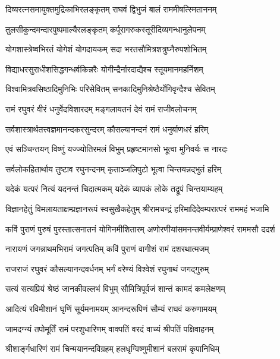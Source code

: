 \twolineshloka
{दिव्यरत्नसमायुक्तमुद्रिकाभिरलङ्कृतम्}
{राघवं द्विभुजं बालं राममीषत्स्मिताननम्}%

\twolineshloka
{तुलसीकुन्दमन्दारपुष्पमाल्यैरलङ्कृतम्}
{कर्पूरागरुकस्तूरीदिव्यगन्धानुलेपनम्}%

\twolineshloka
{योगशास्त्रेष्वभिरतं योगेशं योगदायकम्}
{सदा भरतसौमित्रशत्रुघ्नैरुपशोभितम्}%

\twolineshloka
{विद्याधरसुराधीशसिद्धगन्धर्वकिन्नरैः}
{योगीन्द्रैर्नारदाद्यैश्च स्तूयमानमहर्निशम्}%

\twolineshloka
{विश्वामित्रवसिष्ठादिमुनिभिः परिसेवितम्}
{सनकादिमुनिश्रेष्ठैर्योगिवृन्दैश्च सेवितम्}%

\twolineshloka
{रामं रघुवरं वीरं धनुर्वेदविशारदम्}
{मङ्गलायतनं देवं रामं राजीवलोचनम्}%

\twolineshloka
{सर्वशास्त्रार्थतत्त्वज्ञमानन्दकरसुन्दरम्}
{कौसल्यानन्दनं रामं धनुर्बाणधरं हरिम्}%

\twolineshloka
{एवं सञ्चिन्तयन् विष्णुं यज्ज्योतिरमलं विभुम्}
{प्रहृष्टमानसो भूत्वा मुनिवर्यः स नारदः}%

\twolineshloka
{सर्वलोकहितार्थाय तुष्टाव रघुनन्दनम्}
{कृताञ्जलिपुटो भूत्वा चिन्तयन्नद्भुतं हरिम्}%

\twolineshloka
{यदेकं यत्परं नित्यं यदनन्तं चिदात्मकम्}
{यदेकं व्यापकं लोके तद्रूपं चिन्तयाम्यहम्}%

\fourlineindentedshloka
{विज्ञानहेतुं विमलायताक्षम्}{प्रज्ञानरूपं स्वसुखैकहेतुम्}
{श्रीरामचन्द्रं हरिमादिदेवम्}{परात्परं राममहं भजामि}%

\fourlineindentedshloka
{कविं पुराणं पुरुषं पुरस्तात्}{सनातनं योगिनमीशितारम्}
{अणोरणीयांसमनन्तवीर्यम्}{प्राणेश्वरं राममसौ ददर्श}%

\twolineshloka
{नारायणं जगन्नाथमभिरामं जगत्पतिम्}
{कविं पुराणं वागीशं रामं दशरथात्मजम्}%

\twolineshloka
{राजराजं रघुवरं कौसल्यानन्दवर्धनम्}
{भर्गं वरेण्यं विश्वेशं रघुनाथं जगद्गुरुम्}%

\twolineshloka
{सत्यं सत्यप्रियं श्रेष्ठं जानकीवल्लभं विभुम्}
{सौमित्रिपूर्वजं शान्तं कामदं कमलेक्षणम्}%

\twolineshloka
{आदित्यं रविमीशानं घृणिं सूर्यमनामयम्}
{आनन्दरूपिणं सौम्यं राघवं करुणामयम्}%

\twolineshloka
{जामदग्न्यं तपोमूर्तिं रामं परशुधारिणम्}
{वाक्पतिं वरदं वाच्यं श्रीपतिं पक्षिवाहनम्}%

\twolineshloka
{श्रीशार्ङ्गधारिणं रामं चिन्मयानन्दविग्रहम्}
{हलधृग्विष्णुमीशानं बलरामं कृपानिधिम्}%

